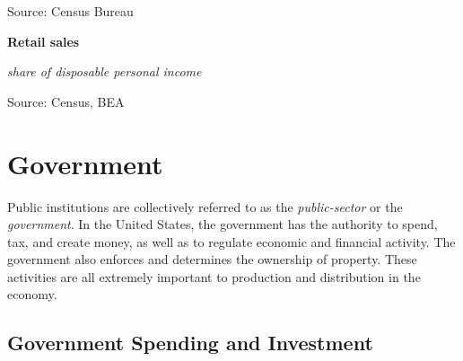 \documentclass{report}
\newcommand{\tbllink}[1]{\href{https://raw.githubusercontent.com/bdecon/US-chartbook/master/chartbook/data/#1}{\faTable}}
\newcommand{\barylab}[2]{yticklabel style={text width=#1, align=right, 
		style={black!70}, text height=#2},}
\newcommand{\bbar}[2]{extra #1 ticks = {{#2}}, extra #1 tick labels = ,
		extra #1 tick style = {grid=major, grid style={thick, black!25}},}
\newcommand{\barplotnogrid}{xbar=0pt, axis line style={draw=none},
	    yticklabel style={align=left, anchor=east},
      		xmajorticks=false, ymajorgrids=false,   
	    ytick=data, tickwidth=0pt, area legend, reverse legend,
	    nodes near coords, nodes near coords align={horizontal},}
\begin{document}
{{{{\begin{minipage}{0.76\textwidth}
\footnotesize{Source: Census Bureau} \hfill \tbllink{marts.csv}

\end{minipage}
\vspace{9mm}

\begin{minipage}{0.4\textwidth}
\normalsize \textbf{Retail sales}

\footnotesize{\textit{share of disposable personal income}}

\hspace*{-2mm} 

\footnotesize{Source: Census, BEA} \hfill \tbllink{rs_comp.csv}

\end{minipage}
\newpage

\begin{minipage}{0.76\textwidth}
\section*{\color{darkgray}\LARGE Government}
\label{sec:gov}
\normalsize

\small Public institutions are collectively referred to as the \textit{public-sector} or the \textit{government}. In the United States, the government has the authority to spend, tax, and create money, as well as to regulate economic and financial activity. The government also enforces and determines the ownership of property. These activities are all extremely important to production and distribution in the economy.

\subsection*{\color{black!70} \seriffont Government Spending and Investment}
\small   
\vspace{4mm}


\end{minipage}}}}}
\end{document}
